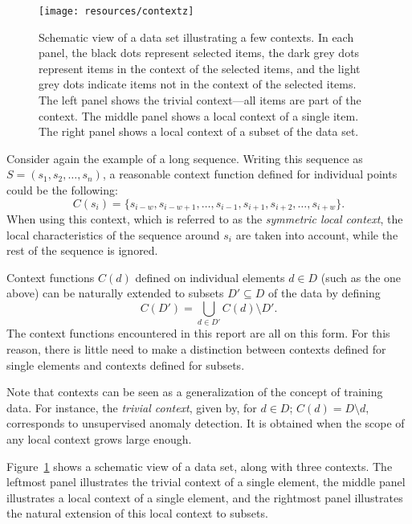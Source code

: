 \begin{figure}[thb]
    \vspace{-4pt}
    \begin{center}
        \leavevmode
        \texttt{[image: resources/contextz]}
    \end{center}
    \vspace{-15pt}
    \caption{{\small Schematic view of a data set illustrating a few contexts. In each panel, the black dots represent selected items, the dark grey dots represent items in the context of the selected items, and the light grey dots indicate items not in the context of the selected items. The left panel shows the trivial context---all items are part of the context. The middle panel shows a local context of a single item. The right panel shows a local context of a subset of the data set.}}
\label{fig:contexts}
    \vspace{-5pt}
\end{figure}

Consider again the example of a long sequence. Writing this sequence as $S = (s_1, s_2, \dots, s_n)$, a reasonable context function defined for individual points could be the following:
\[
    C(s_i) = \{s_{i-w}, s_{i - w + 1}, \dots, s_{i - 1}, s_{i + 1}, s_{i + 2}, \dots, s_{i + w}\}.
\]
When using this context, which is referred to as the \emph{symmetric local context}, the local characteristics of the sequence around $s_i$ are taken into account, while the rest of the sequence is ignored.

Context functions $C(d)$ defined on individual elements $d \in D$ (such as the one above) can be naturally extended to subsets $D' \subseteq D$ of the data by defining
\[
    C(D') = \bigcup_{d \in D'} C(d) \setminus D'.
\]
The context functions encountered in this report are all on this form. For this reason, there is little need to make a distinction between contexts defined for single elements and contexts defined for subsets.

Note that contexts can be seen as a generalization of the concept of training data. For instance, the \emph{trivial context}, given by, for $d \in D$; $C(d) = D \setminus d$, corresponds to unsupervised anomaly detection. It is obtained when the scope of any local context grows large enough.

Figure~\ref{fig:contexts} shows a schematic view of a data set, along with three contexts. The leftmost panel illustrates the trivial context of a single element, the middle panel illustrates a local context of a single element, and the rightmost panel illustrates the natural extension of this local context to subsets.

